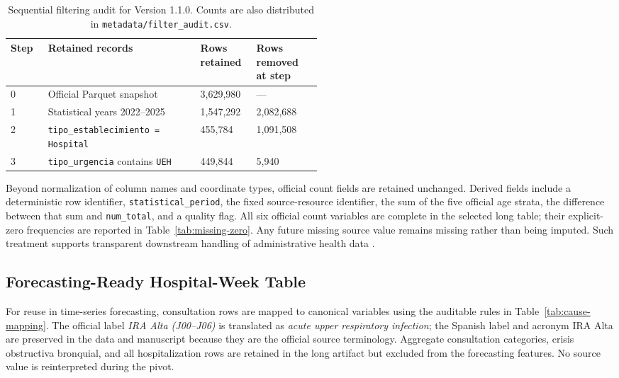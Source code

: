 \documentclass[data,datadescriptor,submit,moreauthors,pdftex]{Definitions/mdpi}
\begin{document}
\begin{table}[H]
\caption{Sequential filtering audit for Version 1.1.0. Counts are also distributed in \texttt{metadata/filter\_audit.csv}.}
\label{tab:filter-audit}
\centering
\begin{tabularx}{\linewidth}{P{0.12\linewidth}L P{0.18\linewidth}P{0.21\linewidth}}
\toprule
Step & Retained records & Rows retained & Rows removed at step \\
 & Official Parquet snapshot & 3,629,980 & --- \\
1 & Statistical years 2022--2025 & 1,547,292 & 2,082,688 \\
2 & \texttt{tipo\_establecimiento = Hospital} & 455,784 & 1,091,508 \\
3 & \texttt{tipo\_urgencia} contains \texttt{UEH} & 449,844 & 5,940 \\
\bottomrule
\end{tabularx}
\end{table}

Beyond normalization of column names and coordinate types, official count fields are retained unchanged. Derived fields include a deterministic row identifier, \texttt{statistical\_period}, the fixed source-resource identifier, the sum of the five official age strata, the difference between that sum and \texttt{num\_total}, and a quality flag. All six official count variables are complete in the selected long table; their explicit-zero frequencies are reported in Table~\ref{tab:missing-zero}. Any future missing source value remains missing rather than being imputed. Such treatment supports transparent downstream handling of administrative health data \citep{Lin2026}.

\subsection{Forecasting-Ready Hospital-Week Table}

For reuse in time-series forecasting, consultation rows are mapped to canonical variables using the auditable rules in Table~\ref{tab:cause-mapping}. The official label \textit{IRA Alta (J00--J06)} is translated as \emph{acute upper respiratory infection}; the Spanish label and acronym IRA Alta are preserved in the data and manuscript because they are the official source terminology. Aggregate consultation categories, crisis obstructiva bronquial, and all hospitalization rows are retained in the long artifact but excluded from the forecasting features. No source value is reinterpreted during the pivot.
\end{document}
